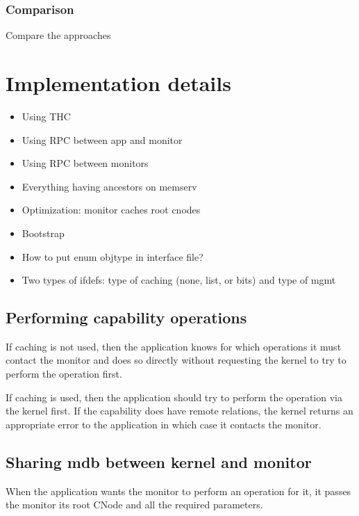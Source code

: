 \documentclass[a4paper,twoside]{report} %
\begin{document}
\subsection{Comparison}
Compare the approaches


\chapter{Implementation details}\label{chap:implementation}

\begin{itemize}
\item Using THC
\item Using RPC between app and monitor
\item Using RPC between monitors
\item Everything having ancestors on memserv
\item Optimization: monitor caches root cnodes
\item Bootstrap
\item How to put enum objtype in interface file?
\item Two types of ifdefs: type of caching (none, list, or bits) and
  type of mgmt
\end{itemize}

\section{Performing capability operations}
If caching is not used, then the application knows for which
operations it must contact the monitor and does so directly without
requesting the kernel to try to perform the operation first.

If caching is used, then the application should try to perform the
operation via the kernel first. If the capability does have remote
relations, the kernel returns an appropriate error to the application
in which case it contacts the monitor.

\section{Sharing mdb between kernel and monitor}
When the application wants the monitor to perform an operation for it,
it passes the monitor its root CNode and all the required parameters.

\end{document}
